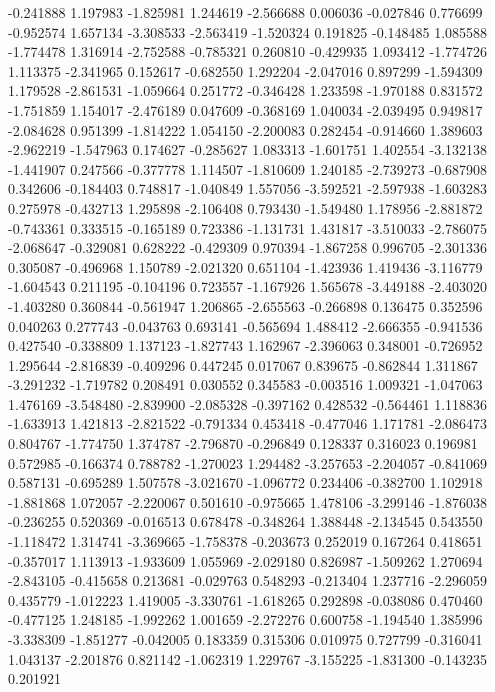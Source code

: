 -0.241888
1.197983
-1.825981
1.244619
-2.566688
0.006036
-0.027846
0.776699
-0.952574
1.657134
-3.308533
-2.563419
-1.520324
0.191825
-0.148485
1.085588
-1.774478
1.316914
-2.752588
-0.785321
0.260810
-0.429935
1.093412
-1.774726
1.113375
-2.341965
0.152617
-0.682550
1.292204
-2.047016
0.897299
-1.594309
1.179528
-2.861531
-1.059664
0.251772
-0.346428
1.233598
-1.970188
0.831572
-1.751859
1.154017
-2.476189
0.047609
-0.368169
1.040034
-2.039495
0.949817
-2.084628
0.951399
-1.814222
1.054150
-2.200083
0.282454
-0.914660
1.389603
-2.962219
-1.547963
0.174627
-0.285627
1.083313
-1.601751
1.402554
-3.132138
-1.441907
0.247566
-0.377778
1.114507
-1.810609
1.240185
-2.739273
-0.687908
0.342606
-0.184403
0.748817
-1.040849
1.557056
-3.592521
-2.597938
-1.603283
0.275978
-0.432713
1.295898
-2.106408
0.793430
-1.549480
1.178956
-2.881872
-0.743361
0.333515
-0.165189
0.723386
-1.131731
1.431817
-3.510033
-2.786075
-2.068647
-0.329081
0.628222
-0.429309
0.970394
-1.867258
0.996705
-2.301336
0.305087
-0.496968
1.150789
-2.021320
0.651104
-1.423936
1.419436
-3.116779
-1.604543
0.211195
-0.104196
0.723557
-1.167926
1.565678
-3.449188
-2.403020
-1.403280
0.360844
-0.561947
1.206865
-2.655563
-0.266898
0.136475
0.352596
0.040263
0.277743
-0.043763
0.693141
-0.565694
1.488412
-2.666355
-0.941536
0.427540
-0.338809
1.137123
-1.827743
1.162967
-2.396063
0.348001
-0.726952
1.295644
-2.816839
-0.409296
0.447245
0.017067
0.839675
-0.862844
1.311867
-3.291232
-1.719782
0.208491
0.030552
0.345583
-0.003516
1.009321
-1.047063
1.476169
-3.548480
-2.839900
-2.085328
-0.397162
0.428532
-0.564461
1.118836
-1.633913
1.421813
-2.821522
-0.791334
0.453418
-0.477046
1.171781
-2.086473
0.804767
-1.774750
1.374787
-2.796870
-0.296849
0.128337
0.316023
0.196981
0.572985
-0.166374
0.788782
-1.270023
1.294482
-3.257653
-2.204057
-0.841069
0.587131
-0.695289
1.507578
-3.021670
-1.096772
0.234406
-0.382700
1.102918
-1.881868
1.072057
-2.220067
0.501610
-0.975665
1.478106
-3.299146
-1.876038
-0.236255
0.520369
-0.016513
0.678478
-0.348264
1.388448
-2.134545
0.543550
-1.118472
1.314741
-3.369665
-1.758378
-0.203673
0.252019
0.167264
0.418651
-0.357017
1.113913
-1.933609
1.055969
-2.029180
0.826987
-1.509262
1.270694
-2.843105
-0.415658
0.213681
-0.029763
0.548293
-0.213404
1.237716
-2.296059
0.435779
-1.012223
1.419005
-3.330761
-1.618265
0.292898
-0.038086
0.470460
-0.477125
1.248185
-1.992262
1.001659
-2.272276
0.600758
-1.194540
1.385996
-3.338309
-1.851277
-0.042005
0.183359
0.315306
0.010975
0.727799
-0.316041
1.043137
-2.201876
0.821142
-1.062319
1.229767
-3.155225
-1.831300
-0.143235
0.201921
